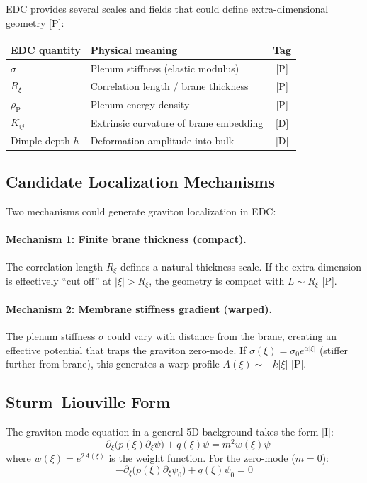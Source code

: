 \documentclass[11pt,a4paper]{article}
\newcommand{\Rxi}{R_\xi}
\newcommand{\rhoP}{\rho_{\text{P}}}
\begin{document}
EDC provides several scales and fields that could define extra-dimensional geometry [P]:

\begin{center}
\begin{tabular}{@{}llc@{}}
\toprule
\textbf{EDC quantity} & \textbf{Physical meaning} & \textbf{Tag} \\
\midrule
$\sigma$ & Plenum stiffness (elastic modulus) & [P] \\
$\Rxi$ & Correlation length / brane thickness & [P] \\
$\rhoP$ & Plenum energy density & [P] \\
$K_{ij}$ & Extrinsic curvature of brane embedding & [D] \\
Dimple depth $h$ & Deformation amplitude into bulk & [D] \\
\bottomrule
\end{tabular}
\end{center}

\subsection{Candidate Localization Mechanisms}

Two mechanisms could generate graviton localization in EDC:

\paragraph{Mechanism 1: Finite brane thickness (compact).}
The correlation length $\Rxi$ defines a natural thickness scale.
If the extra dimension is effectively ``cut off'' at $|\xi| > \Rxi$,
the geometry is compact with $L \sim \Rxi$ [P].

\paragraph{Mechanism 2: Membrane stiffness gradient (warped).}
The plenum stiffness $\sigma$ could vary with distance from the brane,
creating an effective potential that traps the graviton zero-mode.
If $\sigma(\xi) = \sigma_0 e^{\alpha |\xi|}$ (stiffer further from brane),
this generates a warp profile $A(\xi) \sim -k|\xi|$ [P].

\subsection{Sturm--Liouville Form}

The graviton mode equation in a general 5D background takes the form [I]:
\begin{equation}
\label{eq:sturm-liouville}
-\partial_\xi \bigl( p(\xi) \partial_\xi \psi \bigr) + q(\xi) \psi = m^2 w(\xi) \psi
\end{equation}
where $w(\xi) = e^{2A(\xi)}$ is the weight function.
For the zero-mode ($m = 0$):
\begin{equation}
\label{eq:zero-mode-eq}
-\partial_\xi \bigl( p(\xi) \partial_\xi \psi_0 \bigr) + q(\xi) \psi_0 = 0
\end{equation}
\end{document}
